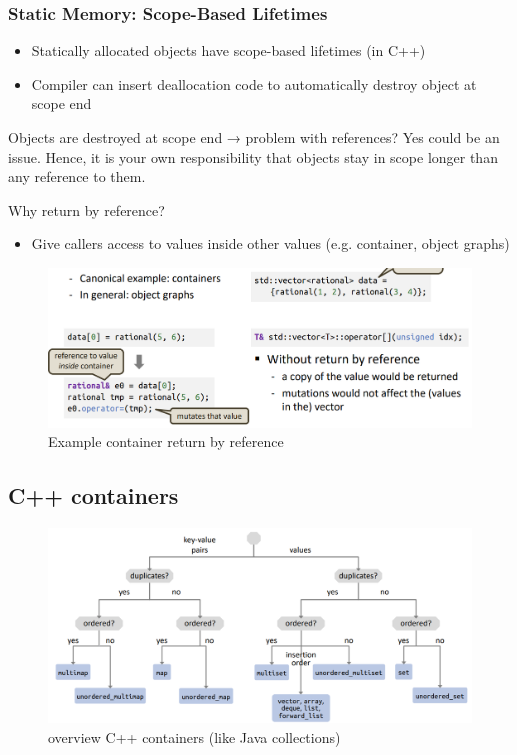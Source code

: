 \documentclass[a4paper,10pt]{article}
\begin{document}
\subsubsection{Static Memory: Scope-Based Lifetimes}
\begin{itemize}
    \item Statically allocated objects have scope-based lifetimes (in C++)
    \item Compiler can insert deallocation code to automatically destroy object at scope end
\end{itemize}
Objects are destroyed at scope end → problem with references? Yes could be an issue. Hence, it is your own responsibility that objects stay in scope longer than any reference to them.
\begin{bembox}
    {Why return by reference?}
    \begin{itemize}
        \item Give callers access to values inside other values (e.g. container, object graphs)
    \end{itemize}
\end{bembox}
 \begin{figure}[h]
            \centering
            \includegraphics[width=0.75\linewidth]{e15.png}
            \caption{Example container return by reference}
            \label{fig:enter-label}
        \end{figure}
\pagebreak
\subsection{C++ containers}
\begin{figure}[h!]
    \centering
    \includegraphics[width=1\linewidth]{e16.png}
    \caption{overview C++ containers (like Java collections)}
    \label{fig:enter-label}
\end{figure}
\end{document}
